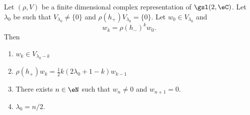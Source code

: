 \begin{proposition}      \label{PROPooZCAOooHHGxQk}
	Let \( (\rho, V)\) be a finite dimensional complex representation of \( \gsl(2,\eC)\). Let \( \lambda_0\) be such that \( V_{\lambda_0}\neq \{ 0 \}\) and \( \rho(h_+)V_{\lambda_0}=\{ 0 \}\). Let \( w_0\in V_{\lambda_0}\) and
	\begin{equation}
		w_k=\rho(h_-)^kw_0.
	\end{equation}
	Then
	\begin{enumerate}
		\item       \label{ITEMooBPPFooKdGyqO}
		      \( w_k\in V_{\lambda_0-k}\)
		\item       \label{ITEMooHNULooHoTgEa}
		      \( \rho(h_+)w_k=\frac{ 1 }{2}k(2\lambda_0+1-k)w_{k-1}\)
		\item       \label{ITEMooHDAPooClASpy}
		      There exists \( n\in \eN\) such that \( w_n\neq 0\) and \( w_{n+1}=0\).
		\item       \label{ITEMooJBZFooGqallS}
		      \( \lambda_0=n/2\).
	\end{enumerate}
\end{proposition}

